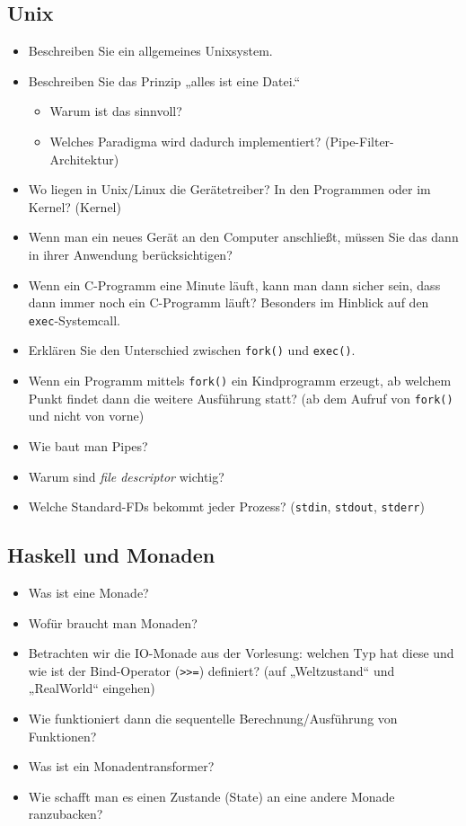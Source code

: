 \documentclass[
  a4paper,
  11pt,
]{article}
\title{}
\author{}
\begin{document}
\thispagestyle{fancy}

\subsection*{Unix}
\label{sub:Unix}

\begin{itemize}
  \item Beschreiben Sie ein allgemeines Unixsystem.
  \item Beschreiben Sie das Prinzip „alles ist eine Datei.“
    \begin{itemize}
      \item Warum ist das sinnvoll?
      \item Welches Paradigma wird dadurch implementiert?
        (Pipe-Filter-Architektur)
    \end{itemize}
  \item Wo liegen in Unix/Linux die Gerätetreiber? In den Programmen oder im
    Kernel? (Kernel)
  \item Wenn man ein neues Gerät an den Computer anschließt, müssen Sie das dann
    in ihrer Anwendung berücksichtigen?
  \item Wenn ein C-Programm eine Minute läuft, kann man dann sicher sein, dass
    dann immer noch ein C-Programm läuft? Besonders im Hinblick auf den
    \texttt{exec}-Systemcall.
  \item Erklären Sie den Unterschied zwischen \texttt{fork()} und
    \texttt{exec()}.
  \item Wenn ein Programm mittels \texttt{fork()} ein Kindprogramm erzeugt, ab
    welchem Punkt findet dann die weitere Ausführung statt? (ab dem Aufruf von
    \texttt{fork()} und nicht von vorne)
  \item Wie baut man Pipes?
  \item Warum sind \textit{file descriptor} wichtig?
  \item Welche Standard-FDs bekommt jeder Prozess? (\texttt{stdin},
    \texttt{stdout}, \texttt{stderr})
\end{itemize}

\subsection*{Haskell und Monaden}
\label{sub:Haskell und Monaden}

\begin{itemize}
  \item Was ist eine Monade?
  \item Wofür braucht man Monaden?
  \item Betrachten wir die IO-Monade aus der Vorlesung: welchen Typ hat diese
    und wie ist der Bind-Operator (\texttt{>>=}) definiert? (auf „Weltzustand“
    und „RealWorld“ eingehen)
  \item Wie funktioniert dann die sequentelle Berechnung/Ausführung von
    Funktionen?
  \item Was ist ein Monadentransformer?
  \item Wie schafft man es einen Zustande (State) an eine andere Monade
    ranzubacken?
\end{itemize}
\end{document}
